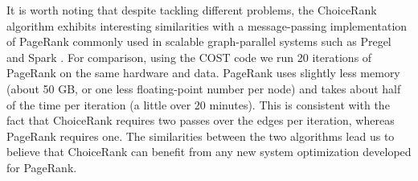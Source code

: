 It is worth noting that despite tackling different problems, the ChoiceRank algorithm exhibits interesting similarities with a message-passing implementation of PageRank commonly used in scalable graph-parallel systems such as Pregel \citep{malewicz2010pregel} and Spark \citep{gonzalez2014graphx}.
For comparison, using the COST code \citep{mcsherry2015scalability} we run \num{20} iterations of PageRank on the same hardware and data.
PageRank uses slightly less memory (about \num{50} GB, or one less floating-point number per node) and takes about half of the time per iteration (a little over \num{20} minutes).
This is consistent with the fact that ChoiceRank requires two passes over the edges per iteration, whereas PageRank requires one.
The similarities between the two algorithms lead us to believe that ChoiceRank can benefit from any new system optimization developed for PageRank.
